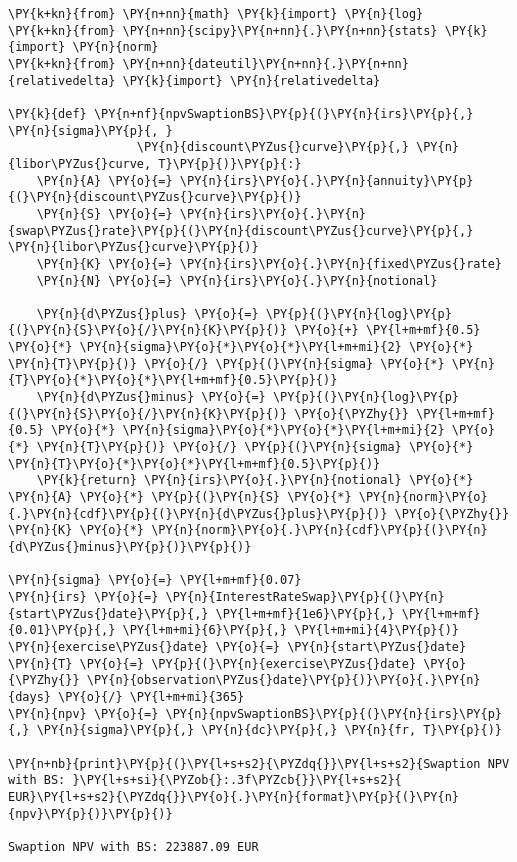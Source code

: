 \begin{codebox}[breakable, size=fbox, boxrule=1pt, pad at break*=1mm,colback=cellbackground, colframe=cellborder]
\begin{Verbatim}[commandchars=\\\{\}]
\PY{k+kn}{from} \PY{n+nn}{math} \PY{k}{import} \PY{n}{log}
\PY{k+kn}{from} \PY{n+nn}{scipy}\PY{n+nn}{.}\PY{n+nn}{stats} \PY{k}{import} \PY{n}{norm} 
\PY{k+kn}{from} \PY{n+nn}{dateutil}\PY{n+nn}{.}\PY{n+nn}{relativedelta} \PY{k}{import} \PY{n}{relativedelta}

\PY{k}{def} \PY{n+nf}{npvSwaptionBS}\PY{p}{(}\PY{n}{irs}\PY{p}{,} \PY{n}{sigma}\PY{p}{, } 
                  \PY{n}{discount\PYZus{}curve}\PY{p}{,} \PY{n}{libor\PYZus{}curve, T}\PY{p}{)}\PY{p}{:}
    \PY{n}{A} \PY{o}{=} \PY{n}{irs}\PY{o}{.}\PY{n}{annuity}\PY{p}{(}\PY{n}{discount\PYZus{}curve}\PY{p}{)}
    \PY{n}{S} \PY{o}{=} \PY{n}{irs}\PY{o}{.}\PY{n}{swap\PYZus{}rate}\PY{p}{(}\PY{n}{discount\PYZus{}curve}\PY{p}{,} \PY{n}{libor\PYZus{}curve}\PY{p}{)}
    \PY{n}{K} \PY{o}{=} \PY{n}{irs}\PY{o}{.}\PY{n}{fixed\PYZus{}rate}
    \PY{n}{N} \PY{o}{=} \PY{n}{irs}\PY{o}{.}\PY{n}{notional}
    
    \PY{n}{d\PYZus{}plus} \PY{o}{=} \PY{p}{(}\PY{n}{log}\PY{p}{(}\PY{n}{S}\PY{o}{/}\PY{n}{K}\PY{p}{)} \PY{o}{+} \PY{l+m+mf}{0.5} \PY{o}{*} \PY{n}{sigma}\PY{o}{*}\PY{o}{*}\PY{l+m+mi}{2} \PY{o}{*} \PY{n}{T}\PY{p}{)} \PY{o}{/} \PY{p}{(}\PY{n}{sigma} \PY{o}{*} \PY{n}{T}\PY{o}{*}\PY{o}{*}\PY{l+m+mf}{0.5}\PY{p}{)}
    \PY{n}{d\PYZus{}minus} \PY{o}{=} \PY{p}{(}\PY{n}{log}\PY{p}{(}\PY{n}{S}\PY{o}{/}\PY{n}{K}\PY{p}{)} \PY{o}{\PYZhy{}} \PY{l+m+mf}{0.5} \PY{o}{*} \PY{n}{sigma}\PY{o}{*}\PY{o}{*}\PY{l+m+mi}{2} \PY{o}{*} \PY{n}{T}\PY{p}{)} \PY{o}{/} \PY{p}{(}\PY{n}{sigma} \PY{o}{*} \PY{n}{T}\PY{o}{*}\PY{o}{*}\PY{l+m+mf}{0.5}\PY{p}{)}
    \PY{k}{return} \PY{n}{irs}\PY{o}{.}\PY{n}{notional} \PY{o}{*} \PY{n}{A} \PY{o}{*} \PY{p}{(}\PY{n}{S} \PY{o}{*} \PY{n}{norm}\PY{o}{.}\PY{n}{cdf}\PY{p}{(}\PY{n}{d\PYZus{}plus}\PY{p}{)} \PY{o}{\PYZhy{}} \PY{n}{K} \PY{o}{*} \PY{n}{norm}\PY{o}{.}\PY{n}{cdf}\PY{p}{(}\PY{n}{d\PYZus{}minus}\PY{p}{)}\PY{p}{)}

\PY{n}{sigma} \PY{o}{=} \PY{l+m+mf}{0.07}
\PY{n}{irs} \PY{o}{=} \PY{n}{InterestRateSwap}\PY{p}{(}\PY{n}{start\PYZus{}date}\PY{p}{,} \PY{l+m+mf}{1e6}\PY{p}{,} \PY{l+m+mf}{0.01}\PY{p}{,} \PY{l+m+mi}{6}\PY{p}{,} \PY{l+m+mi}{4}\PY{p}{)}
\PY{n}{exercise\PYZus{}date} \PY{o}{=} \PY{n}{start\PYZus{}date} 
\PY{n}{T} \PY{o}{=} \PY{p}{(}\PY{n}{exercise\PYZus{}date} \PY{o}{\PYZhy{}} \PY{n}{observation\PYZus{}date}\PY{p}{)}\PY{o}{.}\PY{n}{days} \PY{o}{/} \PY{l+m+mi}{365}
\PY{n}{npv} \PY{o}{=} \PY{n}{npvSwaptionBS}\PY{p}{(}\PY{n}{irs}\PY{p}{,} \PY{n}{sigma}\PY{p}{,} \PY{n}{dc}\PY{p}{,} \PY{n}{fr, T}\PY{p}{)}

\PY{n+nb}{print}\PY{p}{(}\PY{l+s+s2}{\PYZdq{}}\PY{l+s+s2}{Swaption NPV with BS: }\PY{l+s+si}{\PYZob{}:.3f\PYZcb{}}\PY{l+s+s2}{ EUR}\PY{l+s+s2}{\PYZdq{}}\PY{o}{.}\PY{n}{format}\PY{p}{(}\PY{n}{npv}\PY{p}{)}\PY{p}{)}

Swaption NPV with BS: 223887.09 EUR
\end{Verbatim}
\end{codebox}

